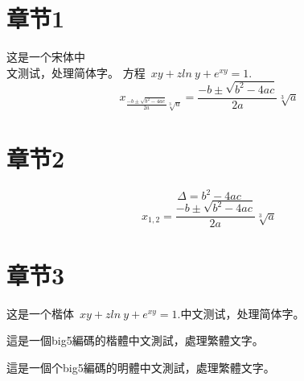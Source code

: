 \documentclass{article}
\begin{document}
	\begin{CJK}{UTF8}{gbsn}
    
    		\section{章节1}    		
			这是一个宋体中\\
			文测试，处理简体字。
			方程~$xy+zln~y+e^{xy} = 1. $ $$x_{\frac{-b \pm \sqrt{b^2 - 4ac}}{2a}\sqrt[3]{a}} = \frac{-b \pm \sqrt{b^2 - 4ac}}{2a}\sqrt[3]{a}$$
			\section{章节2}
			$$\Delta = b^2 - 4ac$$
    		$$x_{1,2} = \frac{-b \pm \sqrt{b^2 - 4ac}}{2a}\sqrt[3]{a}$$
			\section{章节3}	
    	\end{CJK}
   		\begin{CJK}{UTF8}{gkai}
    	这是一个楷体~$xy+zln~y+e^{xy} = 1. $中文测试，处理简体字。
    	\end{CJK}
    	
    	\begin{CJK}{UTF8}{bkai}
    	這是一個big5編碼的楷體中文測試，處理繁體文字。
    	\end{CJK}
    	
    	\begin{CJK}{UTF8}{bsmi}
    	這是一個个big5編碼的明體中文測試，處理繁體文字。
    	\end{CJK}
    
\end{document}
